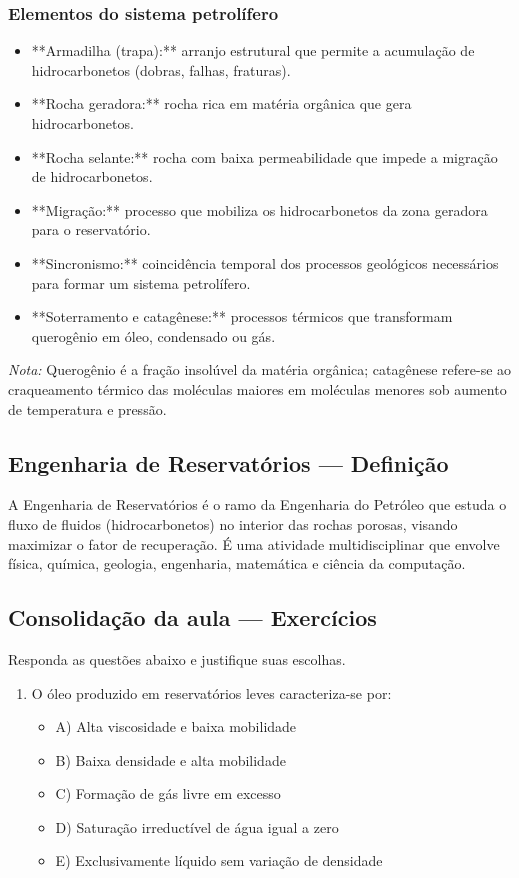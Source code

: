 \documentclass[11pt,a4paper]{article}
\begin{document}
\subsubsection{Elementos do sistema petrolífero}
\begin{itemize}
\item **Armadilha (trapa):** arranjo estrutural que permite a acumulação de hidrocarbonetos (dobras, falhas, fraturas).
\item **Rocha geradora:** rocha rica em matéria orgânica que gera hidrocarbonetos.
\item **Rocha selante:** rocha com baixa permeabilidade que impede a migração de hidrocarbonetos.
\item **Migração:** processo que mobiliza os hidrocarbonetos da zona geradora para o reservatório.
\item **Sincronismo:** coincidência temporal dos processos geológicos necessários para formar um sistema petrolífero.
\item **Soterramento e catagênese:** processos térmicos que transformam querogênio em óleo, condensado ou gás.
\end{itemize}

 \emph{Nota:} Querogênio é a fração insolúvel da matéria orgânica; catagênese refere-se ao craqueamento térmico das moléculas maiores em moléculas menores sob aumento de temperatura e pressão.

\subsection{Engenharia de Reservatórios — Definição}
 A Engenharia de Reservatórios é o ramo da Engenharia do Petróleo que estuda o fluxo de fluidos (hidrocarbonetos) no interior das rochas porosas, visando maximizar o fator de recuperação. É uma atividade multidisciplinar que envolve física, química, geologia, engenharia, matemática e ciência da computação.

\subsection{Consolidação da aula — Exercícios}
 Responda as questões abaixo e justifique suas escolhas.

\begin{enumerate}
\item O óleo produzido em reservatórios leves caracteriza-se por:
\begin{itemize}
\item A) Alta viscosidade e baixa mobilidade
\item B) Baixa densidade e alta mobilidade
\item C) Formação de gás livre em excesso
\item D) Saturação irreductível de água igual a zero
\item E) Exclusivamente líquido sem variação de densidade
\end{itemize}
\end{enumerate}
\end{document}
